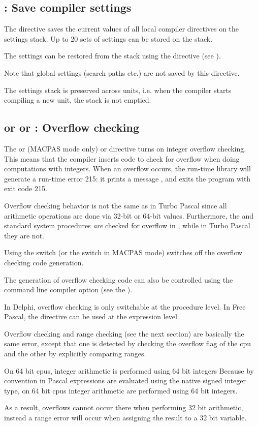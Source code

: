 \subsection{ : Save compiler settings}
\label{se:Push}
The  directive saves the current values of all local compiler
directives on the settings stack. Up to 20 sets of settings can be stored on the stack.

The settings can be restored from the stack using the  directive
(see ).

Note that global settings (search paths etc.) are not saved by this 
directive.

The settings stack is preserved across units, i.e. when the compiler starts
compiling a new unit, the stack is not emptied.

\subsection{ or  or : Overflow checking}
%
The  or  (MACPAS mode only) or  directive turns on
integer overflow checking. This means that the compiler inserts code
to check for overflow when doing computations with integers.
When an overflow occurs, the run-time library will generate a run-time error 215: 
it prints a message , and exits the program with exit code 215.

\begin{remark}
Overflow checking behavior is not the same as in
Turbo Pascal since all arithmetic operations are done via 32-bit or
64-bit values. Furthermore, the  and  standard system
procedures {\em are} checked for overflow in \fpc, while in Turbo
Pascal they are not.
\end{remark}
Using the  switch (or the  switch in MACPAS mode) switches off the overflow
checking code generation.

The generation of overflow checking code can also be controlled
using the  command line compiler option (see the \userref).

In Delphi, overflow checking is only switchable at the procedure level. 
In Free Pascal, the  directive can be used at the expression level.

\begin{remark}
Overflow checking and range checking (see the next section) are basically the same error, 
except that one is detected by checking the overflow flag of the cpu and the other by 
explicitly comparing ranges.

On 64 bit cpus, integer arithmetic is performed using 64 bit integers 
Because by convention in Pascal expressions are evaluated using the native signed integer
type, on 64 bit cpus integer arithmetic are performed using 64 bit integers. 
 
As a result, overflows cannot occur there when performing 32 bit arithmetic,
instead a range error will occur when assigning the result to a 32 bit variable.
\end{remark}

